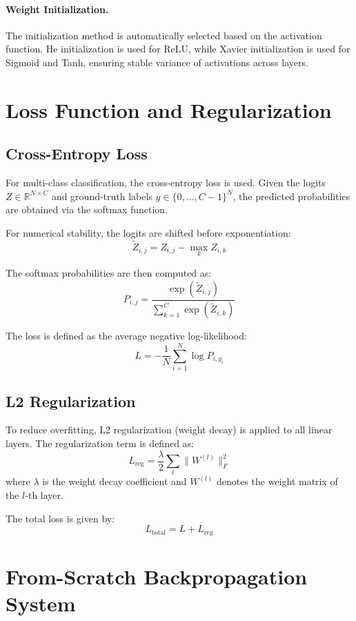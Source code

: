 \documentclass[11pt]{article}
\begin{document}
\paragraph{Weight Initialization.}
The initialization method is automatically selected based on the activation function. He initialization is used for ReLU, while Xavier initialization is used for Sigmoid and Tanh, ensuring stable variance of activations across layers.

\section{Loss Function and Regularization}

\subsection{Cross-Entropy Loss}

For multi-class classification, the cross-entropy loss is used. Given the logits $Z \in \mathbb{R}^{N \times C}$ and ground-truth labels $y \in \{0, \dots, C-1\}^N$, the predicted probabilities are obtained via the softmax function.

For numerical stability, the logits are shifted before exponentiation:
\[
\tilde{Z}_{i,j} = Z_{i,j} - \max_{k} Z_{i,k}
\]

The softmax probabilities are then computed as:
\[
P_{i,j} = \frac{\exp(\tilde{Z}_{i,j})}{\sum_{k=1}^{C} \exp(\tilde{Z}_{i,k})}
\]

The loss is defined as the average negative log-likelihood:
\[
L = -\frac{1}{N} \sum_{i=1}^{N} \log P_{i, y_i}
\]

\subsection{L2 Regularization}

To reduce overfitting, L2 regularization (weight decay) is applied to all linear layers. The regularization term is defined as:
\[
L_{\text{reg}} = \frac{\lambda}{2} \sum_{l} \| W^{(l)} \|_F^2
\]
where $\lambda$ is the weight decay coefficient and $W^{(l)}$ denotes the weight matrix of the $l$-th layer.

The total loss is given by:
\[
L_{\text{total}} = L + L_{\text{reg}}
\]

\section{From-Scratch Backpropagation System}
\end{document}
